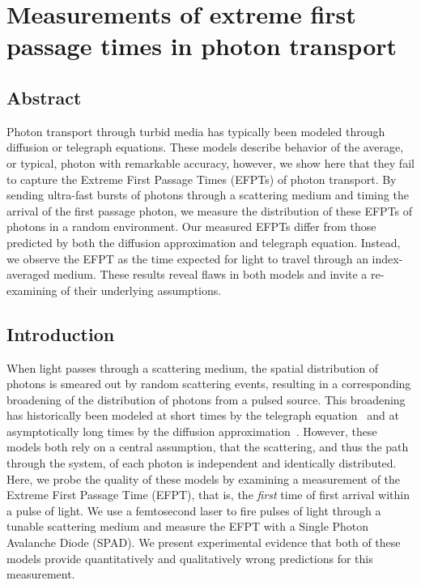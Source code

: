 \chapter{Measurements of extreme first passage times in photon transport}
\label{ch4_photons}

\section{Abstract}
Photon transport through turbid media has typically been modeled through diffusion or telegraph equations. These models describe behavior of the average, or typical, photon with remarkable accuracy, however, we show here that they fail to capture the Extreme First Passage Times (EFPTs) of photon transport. By sending ultra-fast bursts of photons through a scattering medium and timing the arrival of the first passage photon, we measure the distribution of these EFPTs of photons in a random environment. Our measured EFPTs differ from those predicted by both the diffusion approximation and telegraph equation. Instead, we observe the EFPT as the time expected for light to travel through an index-averaged medium. These results reveal flaws in both models and invite a re-examining of their underlying assumptions.

\section{Introduction}
When light passes through a scattering medium, the spatial distribution of photons is smeared out by random scattering events, resulting in a corresponding broadening of the distribution of photons from a pulsed source. This broadening has historically been modeled at short times by the telegraph equation~\cite{goldstein_diffusion_1951,ishimaru_diffusion_1989,durian_photon_1997,lemieux_diffusing-light_1998} and at asymptotically long times by the diffusion approximation~\cite{haskell_boundary_1994,bohren_absorption_1983,ishimaru_wave_1997}.  However, these models both rely on a central assumption, that the scattering, and thus the path through the system, of each photon is independent and identically distributed.  Here, we probe the quality of these models by examining a measurement of the Extreme First Passage Time (EFPT), that is, the \textit{first} time of first arrival within a pulse of light.  We use a femtosecond laser to fire pulses of light through a tunable scattering medium and measure the EFPT with a Single Photon Avalanche Diode (SPAD).  We present experimental evidence that both of these models provide quantitatively and qualitatively wrong predictions for this measurement. 

